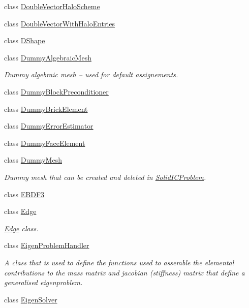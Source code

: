 \begin{DoxyCompactItemize}
class \hyperlink{classoomph_1_1DoubleVectorHaloScheme}{Double\+Vector\+Halo\+Scheme}
\item 
class \hyperlink{classoomph_1_1DoubleVectorWithHaloEntries}{Double\+Vector\+With\+Halo\+Entries}
\item 
class \hyperlink{classoomph_1_1DShape}{D\+Shape}
\item 
class \hyperlink{classoomph_1_1DummyAlgebraicMesh}{Dummy\+Algebraic\+Mesh}
\begin{DoxyCompactList}\small\item\em Dummy algebraic mesh -- used for default assignements. \end{DoxyCompactList}\item 
class \hyperlink{classoomph_1_1DummyBlockPreconditioner}{Dummy\+Block\+Preconditioner}
\item 
class \hyperlink{classoomph_1_1DummyBrickElement}{Dummy\+Brick\+Element}
\item 
class \hyperlink{classoomph_1_1DummyErrorEstimator}{Dummy\+Error\+Estimator}
\item 
class \hyperlink{classoomph_1_1DummyFaceElement}{Dummy\+Face\+Element}
\item 
class \hyperlink{classoomph_1_1DummyMesh}{Dummy\+Mesh}
\begin{DoxyCompactList}\small\item\em Dummy mesh that can be created and deleted in \hyperlink{classoomph_1_1SolidICProblem}{Solid\+I\+C\+Problem}. \end{DoxyCompactList}\item 
class \hyperlink{classoomph_1_1EBDF3}{E\+B\+D\+F3}
\item 
class \hyperlink{classoomph_1_1Edge}{Edge}
\begin{DoxyCompactList}\small\item\em \hyperlink{classoomph_1_1Edge}{Edge} class. \end{DoxyCompactList}\item 
class \hyperlink{classoomph_1_1EigenProblemHandler}{Eigen\+Problem\+Handler}
\begin{DoxyCompactList}\small\item\em A class that is used to define the functions used to assemble the elemental contributions to the mass matrix and jacobian (stiffness) matrix that define a generalised eigenproblem. \end{DoxyCompactList}\item 
class \hyperlink{classoomph_1_1EigenSolver}{Eigen\+Solver}
\item 

\end{DoxyCompactItemize}
